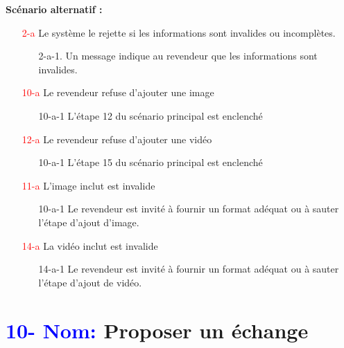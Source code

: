 \documentclass[16pt]{report}
\begin{document}
\textbf{Scénario alternatif :}
\begin{enumerate}[leftmargin=4em]
    \item[\textcolor{red}{2-a}] Le système le rejette si les informations sont invalides ou incomplètes.
            \begin{enumerate}
                    \item[2-a-1.] Un message indique au revendeur que les informations sont invalides.
            \end{enumerate} 

        \item[\textcolor{red}{10-a}] Le revendeur refuse d’ajouter une image
            \begin{enumerate}
                    \item[10-a-1] L’étape 12 du scénario principal est enclenché
            \end{enumerate}


        \item[\textcolor{red}{12-a}] Le revendeur refuse d’ajouter une vidéo
            \begin{enumerate}
                \item[10-a-1] L’étape 15 du scénario principal est enclenché
            \end{enumerate}
        
        \item[\textcolor{red}{11-a}] L’image inclut est invalide 
            \begin{enumerate}
                \item[10-a-1] Le revendeur est invité à fournir un format adéquat ou à sauter l’étape d’ajout d’image.
            \end{enumerate}

        \item[\textcolor{red}{14-a}] La vidéo inclut est invalide 
            \begin{enumerate}
                \item[14-a-1] Le revendeur est invité à fournir un format adéquat ou à sauter l’étape d’ajout de vidéo.
            \end{enumerate}
\end{enumerate}



\section*{\textbf{\textcolor{blue}{10- Nom:}} Proposer un échange}
\end{document}
